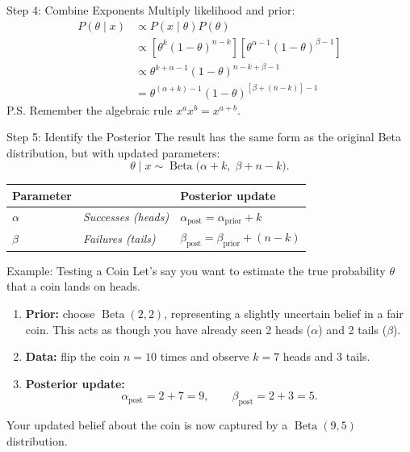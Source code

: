 \documentclass[aspectratio=43,11pt]{beamer}
\begin{document}
  \begin{frame}{Step 4: Combine Exponents}
    Multiply likelihood and prior:
    \begin{align*}
      P(\theta\mid x)
      &\propto P(x\mid\theta)P(\theta)\\
      &\propto [\theta^k(1-\theta)^{n-k}]
      [\theta^{\alpha-1}(1-\theta)^{\beta-1}]\\
      &\propto \theta^{k+\alpha-1}(1-\theta)^{n-k+\beta-1}\\
      &=\theta^{(\alpha+k)-1}(1-\theta)^{[\beta+(n-k)]-1}
    \end{align*}
    \tiny P.S. Remember the algebraic rule $x^a x^b=x^{a+b}$.
  \end{frame}

  \begin{frame}{Step 5: Identify the Posterior}
    The result has the same form as the original Beta distribution, but with updated parameters:
    \[
    \theta\mid x\sim\operatorname{Beta}\bigl(\alpha+k,\;\beta+n-k\bigr).
    \]
    \begin{center}
      \begin{tabular}{>{\bfseries}lll}
        \toprule
        Parameter &  & Posterior update\\
        \midrule
        $\alpha$ & {\footnotesize \it Successes (heads)} & $\alpha_{\text{post}}=\alpha_{\text{prior}}+k$\\
        $\beta$  & {\footnotesize \it Failures (tails)}  & $\beta_{\text{post}}=\beta_{\text{prior}}+(n-k)$\\
        \bottomrule
      \end{tabular}
    \end{center}
  \end{frame}

  \begin{frame}{Example: Testing a Coin}
    \small
    Let's say you want to estimate the true probability $\theta$ that a coin lands on heads.
    \begin{enumerate}
      \item \textbf{Prior:} choose $\operatorname{Beta}(2,2)$, representing a slightly uncertain belief in a fair coin.
      This acts as though you have already seen 2 heads ($\alpha$) and 2 tails ($\beta$).
      \item \textbf{Data:} flip the coin $n=10$ times and observe $k=7$ heads and $3$ tails.
      \item \textbf{Posterior update:}
      \[
      \alpha_{\text{post}}=2+7=9,
      \qquad
      \beta_{\text{post}}=2+3=5.
      \]
    \end{enumerate}
    Your updated belief about the coin is now captured by a $\operatorname{Beta}(9,5)$ distribution.
  \end{frame}
\end{document}
